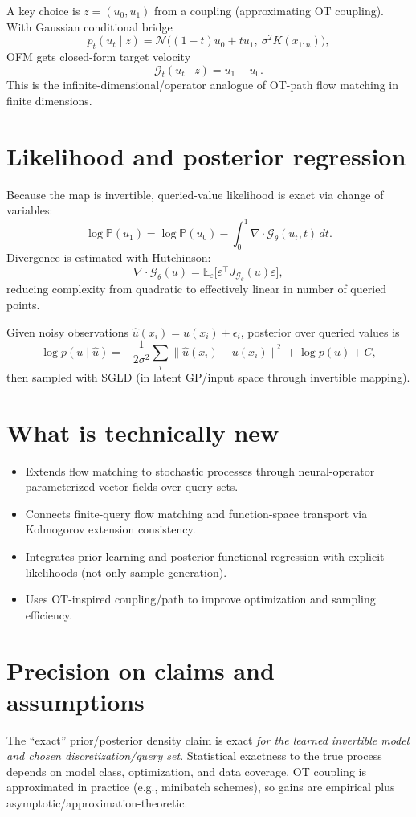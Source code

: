 \documentclass[11pt]{article}
\begin{document}
A key choice is $z=(u_0,u_1)$ from a coupling (approximating OT coupling). With Gaussian conditional bridge
\[
p_t(u_t\mid z)=\mathcal N\big((1-t)u_0+t u_1,\ \sigma^2K(x_{1:n})\big),
\]
OFM gets closed-form target velocity
\[
\mathcal G_t(u_t\mid z)=u_1-u_0.
\]
This is the infinite-dimensional/operator analogue of OT-path flow matching in finite dimensions.

\section*{Likelihood and posterior regression}
Because the map is invertible, queried-value likelihood is exact via change of variables:
\[
\log \mathbb P(u_1)=\log \mathbb P(u_0)-\int_0^1\nabla\cdot\mathcal G_\theta(u_t,t)\,dt.
\]
Divergence is estimated with Hutchinson:
\[
\nabla\cdot\mathcal G_\theta(u)
=\mathbb E_\varepsilon\big[\varepsilon^\top J_{\mathcal G_\theta}(u)\varepsilon\big],
\]
reducing complexity from quadratic to effectively linear in number of queried points.

Given noisy observations $\hat u(x_i)=u(x_i)+\epsilon_i$, posterior over queried values is
\[
\log p(u\mid \hat u)= -\frac{1}{2\sigma^2}\sum_i\|\hat u(x_i)-u(x_i)\|^2 + \log p(u)+C,
\]
then sampled with SGLD (in latent GP/input space through invertible mapping).

\section*{What is technically new}
\begin{itemize}
\item Extends flow matching to stochastic processes through neural-operator parameterized vector fields over query sets.
\item Connects finite-query flow matching and function-space transport via Kolmogorov extension consistency.
\item Integrates prior learning and posterior functional regression with explicit likelihoods (not only sample generation).
\item Uses OT-inspired coupling/path to improve optimization and sampling efficiency.
\end{itemize}

\section*{Precision on claims and assumptions}
The ``exact'' prior/posterior density claim is exact \emph{for the learned invertible model and chosen discretization/query set}. Statistical exactness to the true process depends on model class, optimization, and data coverage. OT coupling is approximated in practice (e.g., minibatch schemes), so gains are empirical plus asymptotic/approximation-theoretic.
\end{document}
